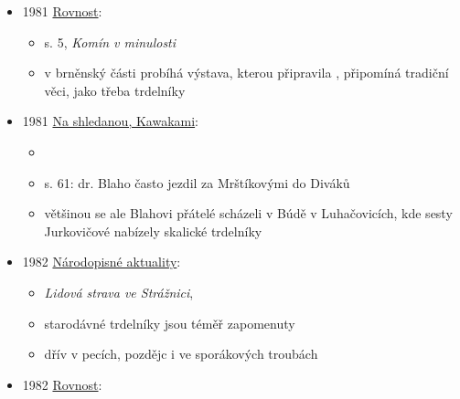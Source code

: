 \begin{itemize}
  \begin{itemize}
  \tightlist
  \item
    Zprávy o lidové stravě v díle J. H. A. Gallaše, Petr Šuleř
  \item
    řeší básníka Josefa Heřmana Gallaše, kterej psal i o lidovým jídle
    začátkem 19. století
  \item
    tyto básně vznikaly kolem roku 1805
  \item
    Gallaš měl informace zprostředkovaný od učitele Matýska z Juřinky, z
    Valašska a pak z venkovanů, se kterýma přicházel do styku v
    Hranicích, kde žil
  \item
    sám byl poloslepý a skoro hluchý
  \item
    s. 129 - trdelníky zařazuje v panském prostředí, ne v lidovém,
  \item
    s. 130 - báseň, popisuje křtiny a v seznamu sladkostí trdelníky.
    možná městský prostředí
  \end{itemize}
\item
  1981
  \href{https://ceskadigitalniknihovna.cz/uuid/uuid:b1f3ed0d-b70a-4847-a4fe-baa804e675fc}{Rovnost}:

  \begin{itemize}
  \tightlist
  \item
    s. 5, \emph{Komín v minulosti}
  \item
    v brněnský části  probíhá výstava, kterou připravila
     , připomíná tradiční věci, jako třeba
    trdelníky
  \end{itemize}
\item
  1981
  \href{https://www.digitalniknihovna.cz/mzk/uuid/uuid:632b87a0-7918-11e3-9be6-005056827e52}{Na
  shledanou, Kawakami}:

  \begin{itemize}
  \tightlist
  \item
  \item
    s. 61: dr. Blaho často jezdil za Mrštíkovými do Diváků
  \item
    většinou se ale Blahovi přátelé scházeli v Búdě v Luhačovicích, kde
    sesty Jurkovičové nabízely skalické trdelníky
  \end{itemize}
\item
  1982
  \href{https://ceskadigitalniknihovna.cz/uuid/uuid:605643a0-4d40-11e5-a525-5ef3fc9ae867}{Národopisné
  aktuality}:

  \begin{itemize}
  \tightlist
  \item
    \emph{Lidová strava ve Strážnici}, 
  \item
    starodávné trdelníky jsou téměř zapomenuty
  \item
    dřív v pecích, pozdějc i ve sporákových troubách
  \end{itemize}
\item
  1982
  \href{https://ceskadigitalniknihovna.cz/uuid/uuid:8e4f05a0-1a98-11f0-8eb6-5ef3fc9bb22f}{Rovnost}:


\end{itemize}
